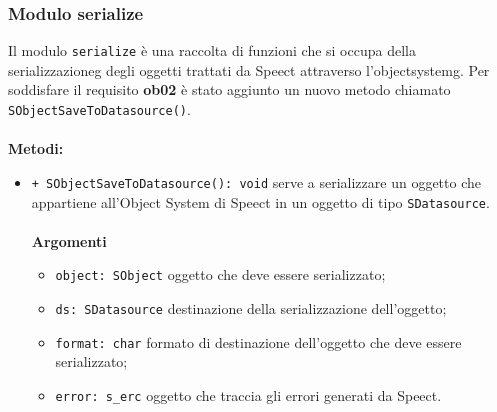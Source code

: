 \subsubsection{Modulo serialize}
Il modulo \texttt{serialize} è una raccolta di funzioni che si occupa della \gls{serializzazioneg} degli oggetti trattati da Speect attraverso l'\gls{objectsystemg}.
Per soddisfare il requisito \textbf{ob02} è stato aggiunto un nuovo metodo chiamato \texttt{SObjectSaveToDatasource()}.\\\\
\textbf{Metodi:}
\begin{itemize}
	\item \texttt{+ SObjectSaveToDatasource(): void} serve a serializzare un oggetto che appartiene all'Object System di Speect in un oggetto di tipo \texttt{SDatasource}.\\\\
	\textbf{Argomenti}
	\begin{itemize}
		\item \texttt{object: SObject} oggetto che deve essere serializzato;
		\item \texttt{ds: SDatasource} destinazione della serializzazione dell'oggetto;
		\item \texttt{format: char} formato di destinazione dell'oggetto che deve essere serializzato;
		\item \texttt{error: s\_erc} oggetto che traccia gli errori generati da Speect.
	\end{itemize}
\end{itemize}

